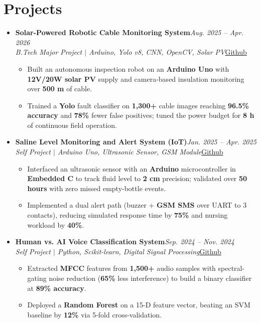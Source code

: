 \documentclass[a4paper,9pt]{extarticle}
\newcommand{\entry}[2]{\textbf{#1}\hfill\textit{#2}\\}
\newcommand{\subentry}[2]{\textit{#1}\hfill#2\\[-7pt]}
\newenvironment{points}
  {\begin{itemize}[label=--,leftmargin=1.2em,topsep=1pt,itemsep=1pt,parsep=0pt]}
  {\end{itemize}\vspace{1pt}}
\newenvironment{entries}
  {\begin{itemize}[label=$\bullet$,leftmargin=1em,topsep=1pt,itemsep=2pt,parsep=0pt]}
  {\end{itemize}}
\begin{document}
\section{Projects}
\begin{entries}

\item \entry{Solar-Powered Robotic Cable Monitoring System}{Aug. 2025 -- Apr. 2026}
      \subentry{B.Tech Major Project $\vert$ Arduino, Yolo v8, CNN, OpenCV, Solar PV}{\href{https://github.com/RAZASHAUD}{Github}}
      \begin{points}
        \item Built an autonomous inspection robot on an \textbf{Arduino Uno} with \textbf{12V/20W solar PV} supply and camera-based insulation monitoring over \textbf{500 m} of cable.
        \item Trained a \textbf{Yolo} fault classifier on \textbf{1,300+} cable images reaching \textbf{96.5\% accuracy} and \textbf{78\%} fewer false positives; tuned the power budget for \textbf{8 h} of continuous field operation.
      \end{points}

\item \entry{Saline Level Monitoring and Alert System (IoT)}{Jan. 2025 -- Apr. 2025}
      \subentry{Self Project $\vert$ Arduino Uno, Ultrasonic Sensor, GSM Module}{\href{https://github.com/RAZASHAUD}{Github}}
      \begin{points}
        \item Interfaced an ultrasonic sensor with an \textbf{Arduino} microcontroller in \textbf{Embedded C} to track fluid level to \textbf{2 cm} precision; validated over \textbf{50 hours} with zero missed empty-bottle events.
        \item Implemented a dual alert path (buzzer + \textbf{GSM SMS} over UART to 3 contacts), reducing simulated response time by \textbf{75\%} and nursing workload by \textbf{40\%}.
      \end{points}

\item \entry{Human vs. AI Voice Classification System}{Sep. 2024 -- Nov. 2024}
      \subentry{Self Project $\vert$ Python, Scikit-learn, Digital Signal Processing}{\href{https://github.com/RAZASHAUD}{Github}}
      \begin{points}
        \item Extracted \textbf{MFCC} features from \textbf{1,500+} audio samples with spectral-gating noise reduction (\textbf{65\%} less interference) to build a binary classifier at \textbf{89\% accuracy}.
        \item Deployed a \textbf{Random Forest} on a 15-D feature vector, beating an SVM baseline by \textbf{12\%} via 5-fold cross-validation.
      \end{points}

\end{entries}
\end{document}
